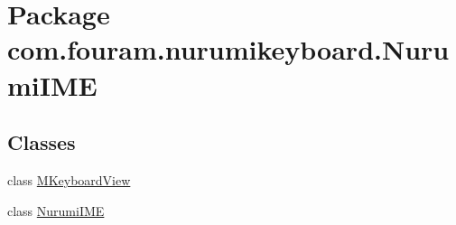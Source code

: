 \hypertarget{namespacecom_1_1fouram_1_1nurumikeyboard_1_1_nurumi_i_m_e}{}\section{Package com.\+fouram.\+nurumikeyboard.\+Nurumi\+I\+M\+E}
\label{namespacecom_1_1fouram_1_1nurumikeyboard_1_1_nurumi_i_m_e}
\subsection*{Classes}
\begin{DoxyCompactItemize}
\item 
class \hyperlink{classcom_1_1fouram_1_1nurumikeyboard_1_1_nurumi_i_m_e_1_1_m_keyboard_view}{M\+Keyboard\+View}
\item 
class \hyperlink{classcom_1_1fouram_1_1nurumikeyboard_1_1_nurumi_i_m_e_1_1_nurumi_i_m_e}{Nurumi\+I\+M\+E}
\end{DoxyCompactItemize}
